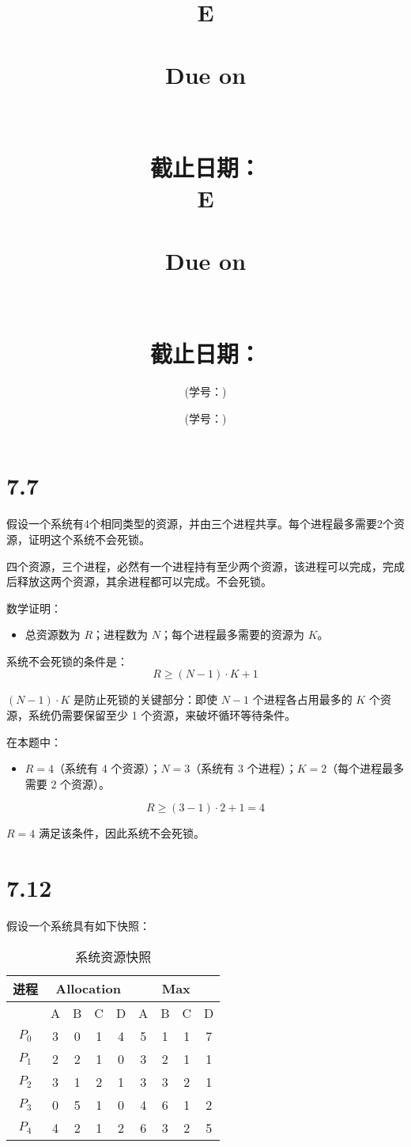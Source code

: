 \documentclass[UTF8]{homework}
\date{} %
\title{
        \vspace{3in}
        \if\hmwkLanguage E
            \huge{\textbf{\hmwkClass}}\\
            \vspace{0.4in}
            \huge{\textbf{\hmwkTitle}}\\
            \vspace{0.4in}
            \normalsize{Due on \hmwkDueDate}\\
        \else
            \Huge{\textbf{\hmwkClassCN}}\\
            \vspace{0.3in}
            \Huge{\textbf{\hmwkTitleCN}}\\
            \vspace{0.4in}
            \normalsize{截止日期：\hmwkDueDateCN}\\
        \fi
        \vspace{2.4in}
    }
\author{\hmwkAuthorName}
\author{\hmwkAuthorNameCN (学号：\hmwkAuthorIDCN)}
\date{}
\title{
        \if\hmwkLanguage E
            \huge{\textbf{\hmwkClass}}\\
            \vspace{0.05in}
            \huge{\textbf{\hmwkTitle}}\\
            \vspace{0.2in}
            \normalsize{Due on \hmwkDueDate}\\
        \else
            \Huge{\textbf{\hmwkClassCN}}\\
            \vspace{0.05in}
            \Huge{\textbf{\hmwkTitleCN}}\\
            \vspace{0.2in}
            \normalsize{截止日期：\hmwkDueDateCN}\\
        \fi
    }
\author{\hmwkAuthorName}
\author{\hmwkAuthorNameCN (学号：\hmwkAuthorIDCN)}
\date{}
\begin{document}
\maketitle
\if{}
    \pagebreak
\fi


%
%
\begin{homeworkProblem}

\section{7.7}

假设一个系统有4个相同类型的资源，并由三个进程共享。每个进程最多需要2个资源，证明这个系统不会死锁。

\solution

四个资源，三个进程，必然有一个进程持有至少两个资源，该进程可以完成，完成后释放这两个资源，其余进程都可以完成。不会死锁。

数学证明：

\begin{itemize}
    \item 总资源数为 $R$；进程数为 $N$；每个进程最多需要的资源为 $K$。
\end{itemize}

系统不会死锁的条件是：
\[
R \geq (N - 1) \cdot K + 1
\]


$(N-1) \cdot K$ 是防止死锁的关键部分：即使 $N-1$ 个进程各占用最多的 $K$ 个资源，系统仍需要保留至少 1 个资源，来破坏循环等待条件。


在本题中：
\begin{itemize}
    \item $R = 4$（系统有 4 个资源）；$N = 3$（系统有 3 个进程）；$K = 2$（每个进程最多需要 2 个资源）。
\end{itemize}

\[
R \geq (3 - 1) \cdot 2 + 1 = 4
\]

$R = 4$ 满足该条件，因此系统不会死锁。

\section{7.12}

假设一个系统具有如下快照：

\begin{table}[H]
\centering
\renewcommand{\arraystretch}{1.5} %
\begin{tabular}{|c|c|c|c|c|c|c|c|c|}
\hline
\textbf{进程} & \multicolumn{4}{|c|}{\textbf{Allocation}} & \multicolumn{4}{|c|}{\textbf{Max}} \\ \hline
 & A & B & C & D & A & B & C & D \\ \hline
$P_0$ & 3 & 0 & 1 & 4 & 5 & 1 & 1 & 7 \\ \hline
$P_1$ & 2 & 2 & 1 & 0 & 3 & 2 & 1 & 1 \\ \hline
$P_2$ & 3 & 1 & 2 & 1 & 3 & 3 & 2 & 1 \\ \hline
$P_3$ & 0 & 5 & 1 & 0 & 4 & 6 & 1 & 2 \\ \hline
$P_4$ & 4 & 2 & 1 & 2 & 6 & 3 & 2 & 5 \\ \hline
\end{tabular}
\caption{系统资源快照}
\end{table}


\end{homeworkProblem}
\end{document}

